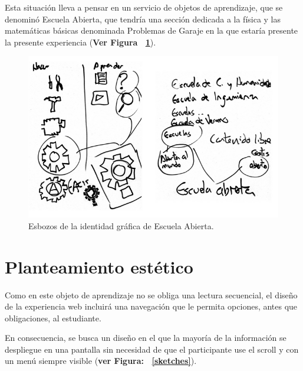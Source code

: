 \documentclass[twoside,letterpaper,11pt]{report}
\begin{document}
Esta situación lleva a pensar en un servicio de objetos de aprendizaje, que se denominó Escuela Abierta, que tendría una sección dedicada a la física y las matemáticas básicas denominada Problemas de Garaje en la que estaría presente la presente experiencia (\textbf{Ver Figura ~\ref{esbozos}}). 

\begin{figure}[h!]
\label{esbozos}
\includegraphics[width=1\textwidth]{aux/esbozos}
\caption{Esbozos de la identidad gráfica de Escuela Abierta.}
\end{figure}



\section{Planteamiento estético} %
\label{sec:planteamiento_est_tico}

Como en este objeto de aprendizaje no se obliga una lectura secuencial, el diseño de la experiencia web incluirá una navegación que le permita opciones, antes que obligaciones, al estudiante.

En consecuencia, se busca un diseño en el que la mayoría de la información se despliegue en una pantalla sin necesidad de que el participante use el scroll y con un menú siempre visible (\textbf{ver Figura: ~\ref{sketches}}).
\end{document}
